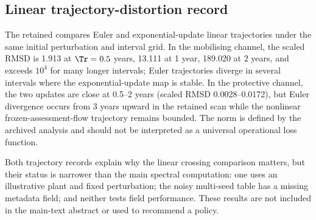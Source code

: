 \subsection{Linear trajectory-distortion record}

The retained \texttt{} compares Euler and exponential-update linear trajectories under the same initial perturbation and interval grid. In the mobilising channel, the scaled RMSD is 1.913 at \(\Tr=0.5\) years, 13.111 at 1 year, 189.020 at 2 years, and exceeds \(10^4\) for many longer intervals; Euler trajectories diverge in several intervals where the exponential-update map is stable. In the protective channel, the two updates are close at 0.5--2 years (scaled RMSD 0.0028--0.0172), but Euler divergence occurs from 3 years upward in the retained scan while the nonlinear frozen-assessment-flow trajectory remains bounded. The norm is defined by the archived analysis and should not be interpreted as a universal operational loss function.

Both trajectory records explain why the linear crossing comparison matters, but their status is narrower than the main spectral computation: one uses an illustrative plant and fixed perturbation; the noisy multi-seed table has a missing metadata field; and neither tests field performance. These results are not included in the main-text abstract or used to recommend a policy.

